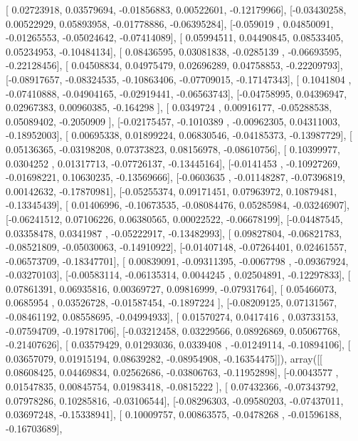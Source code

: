 \documentclass{article}
\begin{document}
       [ 0.02723918,  0.03579694, -0.01856883,  0.00522601, -0.12179966],
       [-0.03430258,  0.00522929,  0.05893958, -0.01778886, -0.06395284],
       [-0.059019  ,  0.04850091, -0.01265553, -0.05024642, -0.07414089],
       [ 0.05994511,  0.04490845,  0.08533405,  0.05234953, -0.10484134],
       [ 0.08436595,  0.03081838, -0.0285139 , -0.06693595, -0.22128456],
       [ 0.04508834,  0.04975479,  0.02696289,  0.04758853, -0.22209793],
       [-0.08917657, -0.08324535, -0.10863406, -0.07709015, -0.17147343],
       [ 0.1041804 , -0.07410888, -0.04904165, -0.02919441, -0.06563743],
       [-0.04758995,  0.04396947,  0.02967383,  0.00960385, -0.164298  ],
       [ 0.0349724 ,  0.00916177, -0.05288538,  0.05089402, -0.2050909 ],
       [-0.02175457, -0.1010389 , -0.00962305,  0.04311003, -0.18952003],
       [ 0.00695338,  0.01899224,  0.06830546, -0.04185373, -0.13987729],
       [ 0.05136365, -0.03198208,  0.07373823,  0.08156978, -0.08610756],
       [ 0.10399977,  0.0304252 ,  0.01317713, -0.07726137, -0.13445164],
       [-0.0141453 , -0.10927269, -0.01698221,  0.10630235, -0.13569666],
       [-0.0603635 , -0.01148287, -0.07396819,  0.00142632, -0.17870981],
       [-0.05255374,  0.09171451,  0.07963972,  0.10879481, -0.13345439],
       [ 0.01406996, -0.10673535, -0.08084476,  0.05285984, -0.03246907],
       [-0.06241512,  0.07106226,  0.06380565,  0.00022522, -0.06678199],
       [-0.04487545,  0.03358478,  0.0341987 , -0.05222917, -0.13482993],
       [ 0.09827804, -0.06821783, -0.08521809, -0.05030063, -0.14910922],
       [-0.01407148, -0.07264401,  0.02461557, -0.06573709, -0.18347701],
       [ 0.00839091, -0.09311395, -0.0067798 , -0.09367924, -0.03270103],
       [-0.00583114, -0.06135314,  0.0044245 ,  0.02504891, -0.12297833],
       [ 0.07861391,  0.06935816,  0.00369727,  0.09816999, -0.07931764],
       [ 0.05466073,  0.0685954 ,  0.03526728, -0.01587454, -0.1897224 ],
       [-0.08209125,  0.07131567, -0.08461192,  0.08558695, -0.04994933],
       [ 0.01570274,  0.0417416 ,  0.03733153, -0.07594709, -0.19781706],
       [-0.03212458,  0.03229566,  0.08926869,  0.05067768, -0.21407626],
       [ 0.03579429,  0.01293036,  0.0339408 , -0.01249114, -0.10894106],
       [ 0.03657079,  0.01915194,  0.08639282, -0.08954908, -0.16354475]]), array([[ 0.08608425,  0.04469834,  0.02562686, -0.03806763, -0.11952898],
       [-0.0043577 ,  0.01547835,  0.00845754,  0.01983418, -0.0815222 ],
       [ 0.07432366, -0.07343792,  0.07978286,  0.10285816, -0.03106544],
       [-0.08296303, -0.09580203, -0.07437011,  0.03697248, -0.15338941],
       [ 0.10009757,  0.00863575, -0.0478268 , -0.01596188, -0.16703689],
\end{document}
